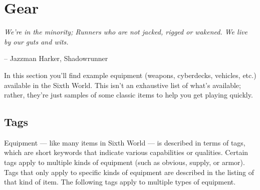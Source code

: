 \chapter{Gear} \label{Gear}

\epigraph{\textit{We're in the minority; Runners who are not jacked, rigged or wakened. We live by our guts and wits.}}{-- Jazzman Harker, Shadowrunner}

In this section you’ll find example equipment (weapons, cyberdecks, vehicles, etc.) available in the Sixth World. This isn’t an exhaustive list of what’s available; rather, they’re just samples of some classic items to help you get playing quickly.


\section{Tags} \label{tags}

Equipment — like many items in Sixth World — is described in terms of tags, which are short keywords that indicate various capabilities or qualities. Certain tags apply to multiple kinds of equipment (such as obvious, supply, or armor). Tags that only apply to specific kinds of equipment are described in the listing of that kind of item. The following tags apply to multiple types of equipment.

